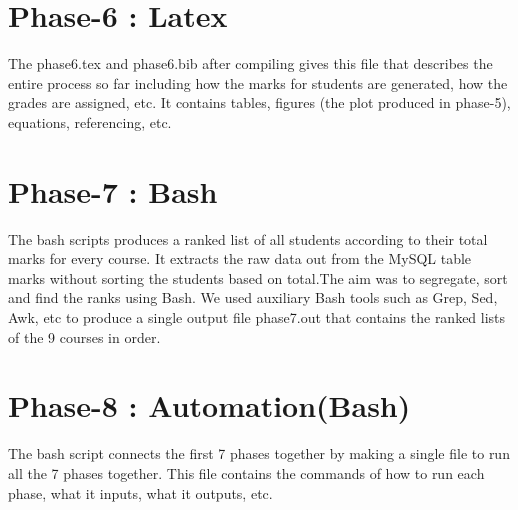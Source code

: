 \documentclass[11pt]{article}
\begin{document}
 \section{Phase-6 : Latex}
 \label{sec:ph6}
 The phase6.tex and phase6.bib after compiling gives this file  that describes the entire process so far including how the marks for students are generated, how the grades are assigned, etc. It contains tables, figures (the plot produced in phase-5), equations, referencing, etc.
 
 \section{Phase-7 : Bash}
 \label{sec:ph7}
 The bash scripts produces a ranked list of all students according to their total marks for every course. It extracts the raw data out from the MySQL table marks without sorting the students based on total.The aim was to segregate, sort and find the ranks using Bash. We used auxiliary Bash tools such as Grep, Sed, Awk, etc to produce a single output file phase7.out that contains the ranked lists of the 9 courses in order.
 
 \section{Phase-8 : Automation(Bash)}
 \label{sec:ph8}
 The bash script connects the first 7 phases together by making a single file to run all the 7 phases together. This file  contains the commands of how to run each phase, what it inputs, what it outputs, etc.
 



\end{document}
